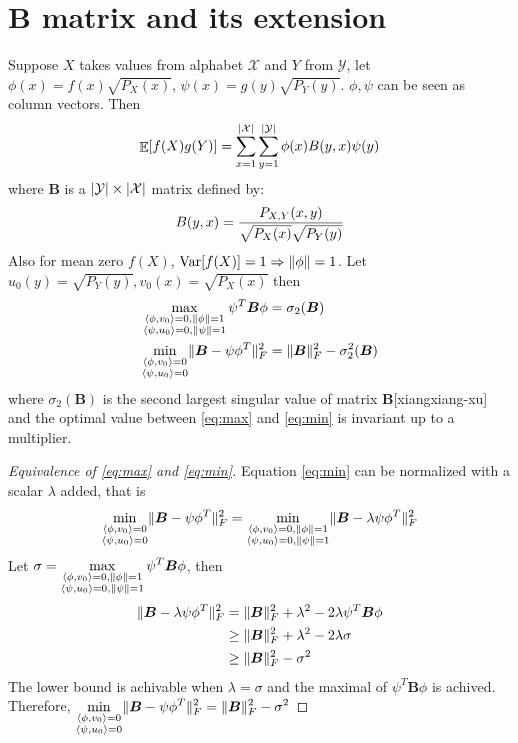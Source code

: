 \documentclass{article}
\DeclareMathOperator\E{\mathbb{E}}
\DeclareMathOperator\Var{\mathrm{Var}}
\DeclarePairedDelimiter\abs{\lvert}{\rvert}
\DeclarePairedDelimiter\norm{\lVert}{\rVert}
\DeclarePairedDelimiter\inner{\langle}{\rangle}
\begin{document}
\section{$\bm{B}$ matrix and its extension}
Suppose $X$ takes values from alphabet $\mathcal{X}$ and $Y$ from $\mathcal{Y}$,
let $ \phi(x) = f(x) \sqrt{P_X(x)}$, $\psi(x) = g(y) \sqrt{P_Y(y)}$. $\phi, \psi$ can be seen as column vectors. Then
\begin{equation}
\E[f(X) g(Y)] =\sum_{x=1}^{\abs{\mathcal{X}}}\sum_{y=1}^{\abs{\mathcal{Y}}} \phi(x) B(y,x) \psi(y)
\end{equation}
where $\bm{B}$ is a $\abs{\mathcal{Y}}\times \abs{\mathcal{X}}$ matrix defined by:
\begin{equation}
B(y,x) = {P_{X,Y}(x,y) \over \sqrt{P_X(x)}\sqrt{P_Y(y)}}
\end{equation}
Also for mean zero $f(X)$, $\Var[f(X)]=1\Rightarrow \norm{\phi}=1$. Let $u_0(y) = \sqrt{P_Y(y)},v_0(x) = \sqrt{P_X(x)}$ then 
\begin{align}
\label{eq:max}\max_{ \substack{\inner{\phi, v_0} = 0, \norm{\phi}=1 \\ \inner{\psi, u_0}=0, \norm{\psi} = 1}} \psi^T \bm{B} \phi
& = \sigma_2(\bm{B}) \\
\label{eq:min} \min_{\substack{\inner{\phi, v_0} = 0 \\ \inner{\psi, u_0}=0}} \norm{\bm{B}-\psi\phi^T}^2_F  & = \norm{\bm{B}}_F^2- \sigma_2^2(\bm{B})
\end{align}
where $\sigma_2(\bm{B})$ is the second largest singular value of matrix $\bm{B}$[xiangxiang-xu] and the optimal value
between \eqref{eq:max} and \eqref{eq:min} is invariant
up to a multiplier.
\begin{proof}[Equivalence of \eqref{eq:max} and \eqref{eq:min}]
Equation \eqref{eq:min} can be normalized with a scalar $\lambda$ added, that is 
$$
\min_{\substack{\inner{\phi, v_0} = 0 \\ \inner{\psi, u_0}=0}} \norm{\bm{B}-\psi\phi^T}^2_F =\min_{ \substack{\inner{\phi, v_0} = 0, \norm{\phi}=1 \\ \inner{\psi, u_0}=0, \norm{\psi} = 1}} 
\norm{\bm{B}-\lambda \psi\phi^T}^2_F 
$$
Let $ \sigma = \displaystyle\max_{ \substack{\inner{\phi, v_0} = 0, \norm{\phi}=1 \\ \inner{\psi, u_0}=0, \norm{\psi} = 1}} \psi^T \bm{B} \phi$,
then
\begin{align*}
\norm{\bm{B}-\lambda \psi\phi^T}^2_F  & = \norm{\bm{B}}_F^2 + \lambda^2 - 2 \lambda \psi^T \bm{B} \phi \\
& \geq \norm{\bm{B}}_F^2 + \lambda^2 - 2 \lambda \sigma \\
& \geq \norm{\bm{B}}_F^2 - \sigma^2
\end{align*}
The lower bound is achivable when $\lambda = \sigma$ and the maximal of $\psi^T\bm{B}\phi$ is achived. Therefore,
$\displaystyle\min_{\substack{\inner{\phi, v_0} = 0 \\ \inner{\psi, u_0}=0}} \norm{\bm{B}-\psi\phi^T}^2_F = \norm{\bm{B}}_F^2 - \sigma^2$
\end{proof}
\end{document}
